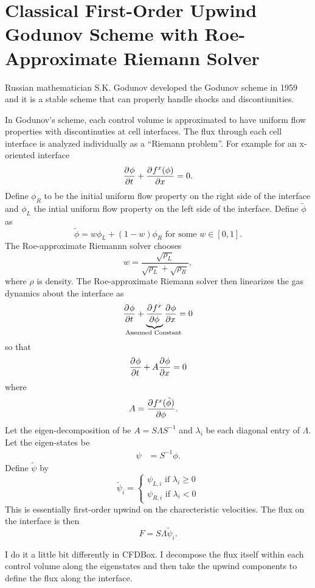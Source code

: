 \documentclass{doc}
\newcommand{\forceindent}{\leavevmode{\parindent=1em\indent}}
\begin{document}
\section{Classical First-Order Upwind Godunov Scheme
         with Roe-Approximate Riemann Solver}
Russian mathematician S.K. Godunov developed the Godunov scheme in 1959 and it is
a stable scheme that can properly handle shocks and discontiunities.

\forceindent In Godunov's scheme, each control volume is approximated to have uniform
flow properties with discontinuties at cell interfaces.  The flux through each
cell interface is analyzed individually as a ``Riemann problem''.  For example for an x-oriented
interface
\begin{align}
    \dfrac{\partial^{} {\phi}}{\partial {t}^{} } + \dfrac{\partial^{} {f^x(\phi)}}{\partial {x}^{} } = 0.
\end{align}
Define $\phi_R$ to be the initial uniform flow property on the right side of the interface and
$\phi_L$ the intial uniform flow property on the left side of the interface.
Define $\tilde{\phi}$ as
\begin{equation}
    \tilde{\phi} = w \phi_L + (1-w) \phi_R\text{ for some $w\in [0, 1]$}.
\end{equation}
The Roe-approximate Riemannn solver chooses
\begin{equation}
    w = \frac{\sqrt{\rho_L}}{\sqrt{\rho_L} + \sqrt{\rho_R}},
\end{equation}
where $\rho$ is density.  The Roe-approximate Riemann solver then linearizes the gas dynamics about
the interface as
\begin{align}
    \pd{\phi}{t} + \underbrace{\pd{f^x}{\phi}}_\text{\hidewidth Assumed Constant \hidewidth} \pd{\phi}{x} = 0
\end{align}
so that
\begin{equation}
    \dfrac{\partial^{} {\phi}}{\partial {t}^{} } + A \dfrac{\partial^{} {\phi}}{\partial {x}^{} } = 0
\end{equation}
where
\begin{align}
    A &= \dfrac{\partial^{} {f^x(\tilde\phi)}}{\partial {\phi}^{} }.
\end{align}
Let the eigen-decomposition of be $A=S\Lambda S^{-1}$ and 
$\lambda_i$ be each diagonal entry of $\Lambda$.  Let
the eigen-states be
\begin{align}
    \psi &= S^{-1} \phi.
\end{align}
Define $\tilde{\psi}$ by
\begin{equation}
    \tilde{\psi}_i = \begin{cases}
        \psi_{L,i} \text{ if } \lambda_i \ge 0 \\
        \psi_{R,i} \text{ if } \lambda_i < 0
    \end{cases}
\end{equation}
This is essentially first-order upwind on the charecteristic velocities.
The flux on the interface is then
\begin{equation}
    F = S \Lambda \tilde{\psi}_i.
\end{equation}

I do it a little bit differently in CFDBox.  I decompose the flux itself
within each control volume along the eigenstates and then take the upwind
components to define the flux along the interface.
\end{document}
